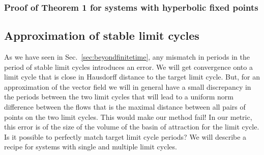 \documentclass{article}
\theoremstyle{definition}
\theoremstyle{remark}
\newcounter{ct}
\begin{document}
%


\subsubsection{Proof of Theorem 1 for systems with hyperbolic fixed points}\label{sec:proof_fp_approx}


\subsection{Approximation of stable limit cycles}\label{sec:lc_approx}
As we have seen in Sec.~\ref{sec:beyondfinitetime}, any mismatch in periods in the period of stable limit cycles introduces an error.
We will get convergence onto a limit cycle that is close in Hausdorff distance to the target limit cycle. %
But, for an approximation of the vector field we will in general have a small discrepancy in the periods between the two limit cycles that will lead to a uniform norm difference between the flows that is the maximal distance between all pairs of points on the two limit cycles.
This would make our method fail!
In our metric, this error is of the size of the volume of the basin of attraction for the limit cycle.
Is it possible to perfectly match target limit cycle periods?
We will describe a recipe for systems with single and multiple limit cycles.
\end{document}
